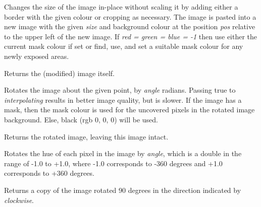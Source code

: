 

\label{wximageresize}


Changes the size of the image in-place without scaling it by adding either a border
with the given colour or cropping as necessary. The image is pasted into a new
image with the given {\it size} and background colour at the position {\it pos}
relative to the upper left of the new image. If {\it red = green = blue = -1}
then use either the  current mask colour if set or find, use, and set a
suitable mask colour for any newly exposed areas.

Returns the (modified) image itself.




\label{wximagerotate}


Rotates the image about the given point, by {\it angle} radians. Passing true
to {\it interpolating} results in better image quality, but is slower. If the
image has a mask, then the mask colour is used for the uncovered pixels in the
rotated image background. Else, black (rgb 0, 0, 0) will be used.

Returns the rotated image, leaving this image intact.


\label{wximagerotatehue}


Rotates the hue of each pixel in the image by {\it angle}, which is a double in
the range of -1.0 to +1.0, where -1.0 corresponds to -360 degrees and +1.0 corresponds
to +360 degrees.


\label{wximagerotate90}


Returns a copy of the image rotated 90 degrees in the direction
indicated by {\it clockwise}.


\label{wximagesavefile}

